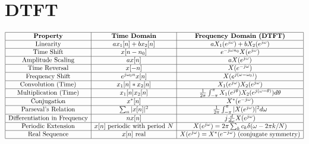 \documentclass{AnantDocumentation}
\begin{document}
\section{DTFT}
\[
\begin{array}{|c|c|c|}
\hline
\textbf{Property} & \textbf{Time Domain} & \textbf{Frequency Domain (DTFT)} \\
\hline
\text{Linearity} & a x_1[n] + b x_2[n] & a X_1(e^{j\omega}) + b X_2(e^{j\omega}) \\
\hline
\text{Time Shift} & x[n - n_0] & e^{-j\omega n_0} X(e^{j\omega}) \\
\hline
\text{Amplitude Scaling} & a x[n] & a X(e^{j\omega}) \\
\hline
\text{Time Reversal} & x[-n] & X(e^{-j\omega}) \\
\hline
\text{Frequency Shift} & e^{j\omega_0 n} x[n] & X(e^{j(\omega - \omega_0)}) \\
\hline
\text{Convolution (Time)} & x_1[n] * x_2[n] & X_1(e^{j\omega}) X_2(e^{j\omega}) \\
\hline
\text{Multiplication (Time)} & x_1[n] x_2[n] & \frac{1}{2\pi}\int_{-\pi}^{\pi} X_1(e^{j\theta}) X_2(e^{j(\omega - \theta)}) d\theta \\
\hline
\text{Conjugation} & x^*[n] & X^*(e^{-j\omega}) \\
\hline
\text{Parseval’s Relation} & \sum_n |x[n]|^2 & \frac{1}{2\pi}\int_{-\pi}^{\pi} |X(e^{j\omega})|^2 d\omega \\
\hline
\text{Differentiation in Frequency} & n x[n] & j \frac{d}{d\omega} X(e^{j\omega}) \\
\hline
\text{Periodic Extension} & x[n] \text{ periodic with period } N & X(e^{j\omega}) = 2\pi \sum_k c_k \delta(\omega - 2\pi k / N) \\
\hline
\text{Real Sequence} & x[n] \text{ real} & X(e^{j\omega}) = X^*(e^{-j\omega}) \ (\text{conjugate symmetry}) \\
\hline
\end{array}
\]
\end{document}
